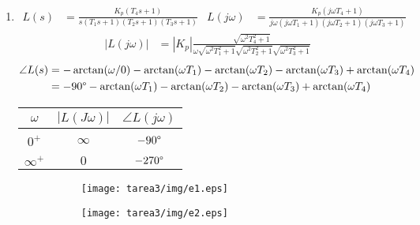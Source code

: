 \begin{ejercicio}
\begin{enumerate}
    \item
      \begin{align*}
        L(s) &= \frac{K_p(T_4 s+1)}{s(T_1 s+1)(T_2 s+1)(T_3s+1)} 
        &
        L(j\omega) &=
          \frac
            {K_p(j\omega T_4+1)}
            {j\omega(j\omega T_1+1)(j\omega T_2+1)(j\omega T_3+1)}
      \end{align*}
      \begin{align*}
        \left|L(j\omega)\right| &=  |K_p|
          \frac
            {\sqrt{\omega^2 T_4^2 + 1}}
            {\omega\sqrt{\omega^2 T_1^2 + 1}\sqrt{\omega^2 T_2^2 + 1}\sqrt{\omega^2 T_3^2 + 1}}
      \end{align*}
      \begin{align*}
        \angle L(s) &= - \arctan(\omega/0) - \arctan(\omega T_1) - \arctan(\omega T_2) - \arctan(\omega T_3) + \arctan(\omega T_4)
        \\
        &= - 90\degree - \arctan(\omega T_1) - \arctan(\omega T_2) - \arctan(\omega T_3) + \arctan(\omega T_4)
      \end{align*}

      \begin{center}
        \begin{tabular}{c | c c}
          $\omega$ & $|L(J\omega)|$ & $\angle L(j\omega)$
          \\ \hline \\
          $0^+$ & $\infty$ & $-90\degree$
          \\\\
          $\infty^+$ & $0$ & $-270\degree$
        \end{tabular}
      \end{center}

      \begin{figure}[H]
        \centering
        \begin{subfigure}{0.45\textwidth}
        \centering
          \texttt{[image: tarea3/img/e1.eps]}
        \end{subfigure}
        \begin{subfigure}{0.45\textwidth}
          \centering
          \texttt{[image: tarea3/img/e2.eps]}
        \end{subfigure}
      \end{figure}
    

\end{enumerate}
\end{ejercicio}

